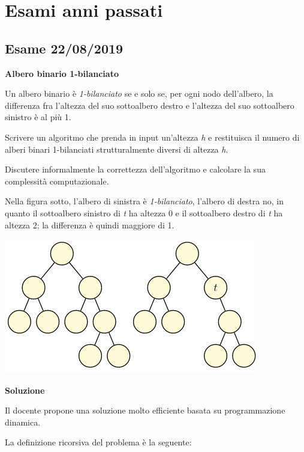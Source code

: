 \documentclass[../cheatSheetAlgoritmi.tex]{subfiles}
\begin{document}
\chapter{Esami anni passati}
\section{Esame 22/08/2019}
\textbf{Albero binario 1-bilanciato} 

Un albero binario è \emph{1-bilanciato} se e solo se, per ogni nodo dell'albero, la differenza fra l'altezza del suo sottoalbero destro e l'altezza del suo sottoalbero sinistro è al più 1. 

Scrivere un algoritmo che prenda in input un'altezza \emph{h} e restituisca il numero di alberi binari 1-bilanciati strutturalmente diversi di altezza \emph{h}. 

Discutere informalmente la correttezza dell'algoritmo e calcolare la sua complessità computazionale. 

Nella figura sotto, l'albero di sinistra è \emph{1-bilanciato}, l'albero di destra no, in quanto il sottoalbero sinistro di \emph{t} ha altezza 0 e il sottoalbero destro di \emph{t} ha altezza 2; la differenza è quindi maggiore di 1.
\begin{center}
	\includegraphics{../img/esame_22082019}
\end{center}
\textbf{Soluzione}  

Il docente propone una soluzione molto efficiente basata su programmazione dinamica. 

La definizione ricorsiva del problema è la seguente: 
\end{document}
